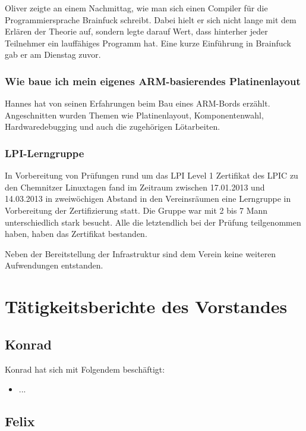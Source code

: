 \documentclass[10pt,DIV16]{scrartcl}
\begin{document}
Oliver zeigte an einem Nachmittag, wie man sich einen Compiler für die
Programmiersprache Brainfuck schreibt. Dabei hielt er sich nicht lange mit
dem Erlären der Theorie auf, sondern legte darauf Wert, dass hinterher jeder
Teilnehmer ein lauffähiges Programm hat. Eine kurze Einführung in Brainfuck
gab er am Dienstag zuvor.

\subsubsection{Wie baue ich mein eigenes ARM-basierendes Platinenlayout}

Hannes hat von seinen Erfahrungen beim Bau eines ARM-Bords erzählt.
Angeschnitten wurden Themen wie Platinenlayout, Komponentenwahl,
Hardwaredebugging und auch die zugehörigen Lötarbeiten.

\subsubsection{LPI-Lerngruppe}

In Vorbereitung von Prüfungen rund um das LPI Level 1 Zertifikat des
LPIC zu den Chemnitzer Linuxtagen fand im Zeitraum zwischen
17.01.2013 und 14.03.2013 in zweiwöchigen Abstand in den Vereinsräumen
eine Lerngruppe in Vorbereitung der Zertifizierung statt. Die Gruppe
war mit 2 bis 7 Mann unterschiedlich stark besucht. Alle die
letztendlich bei der Prüfung teilgenommen haben, haben das
Zertifikat bestanden.

Neben der Bereitstellung der Infrastruktur sind dem Verein keine
weiteren Aufwendungen entstanden.

\section{Tätigkeitsberichte des Vorstandes}

\subsection{Konrad}

Konrad hat sich mit Folgendem beschäftigt:
\begin{itemize}
	\item ...
\end{itemize}

\subsection{Felix}
\end{document}
